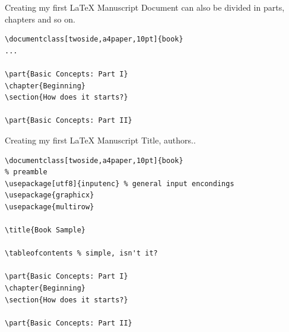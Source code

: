 \begin{frame}[fragile]{Creating my first \LaTeX{} Manuscript}
Document can also be divided in parts, chapters and so on. 
\scriptsize
\begin{verbatim}
\documentclass[twoside,a4paper,10pt]{book}
...

\part{Basic Concepts: Part I}
\chapter{Beginning}
\section{How does it starts?}

\part{Basic Concepts: Part II}

\end{verbatim}
\end{frame}

\begin{frame}[fragile]{Creating my first \LaTeX{} Manuscript}
Title, authors..
\scriptsize
\begin{verbatim}
\documentclass[twoside,a4paper,10pt]{book}
% preamble
\usepackage[utf8]{inputenc} % general input encondings
\usepackage{graphicx}
\usepackage{multirow}

\title{Book Sample}

\tableofcontents % simple, isn't it?

\part{Basic Concepts: Part I}
\chapter{Beginning}
\section{How does it starts?}

\part{Basic Concepts: Part II}

\end{verbatim}
\end{frame}

